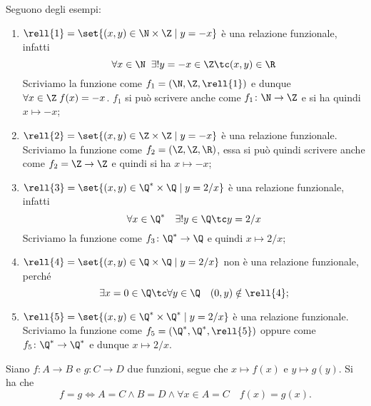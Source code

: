 \begin{examples}
    Seguono degli esempi:
    \begin{enumerate}
        \item \(\rell{1} = \set{(x, y) \in \N \times \Z \mid y = -x}\) è una relazione funzionale, infatti 
            \[
                \forall x \in \N \;\; \exists! y = -x \in \Z \tc (x, y) \in \R
            \]
            Scriviamo la funzione come \(f_1 = (\N, \Z, \rell{1})\) e dunque \(\forall x \in \Z \; f(x) = -x\).
            \(f_1\) si può scrivere anche come \(f_1 \colon \N \to \Z\) e si ha quindi \(x \mapsto -x\);
% 
        \item \(\rell{2} = \set{(x, y) \in \Z \times \Z \mid y = -x}\) è una relazione funzionale. \\
            Scriviamo la funzione come \(f_2 = (\Z, \Z, \R)\), essa si può quindi scrivere anche come \(f_2 = \Z \to \Z\) e quindi si ha \(x \mapsto -x\);
% 
        \item \(\rell{3} = \set{(x, y) \in \Q^* \times \Q \mid y = 2/x}\) è una relazione funzionale, infatti
            \[
                \forall x \in \Q^* \quad \exists! y \in \Q \tc y = 2/x
            \]
            Scriviamo la funzione come \(f_3 \colon \Q^* \to \Q\) e quindi \(x \mapsto 2/x\);
% 
        \item \(\rell{4} = \set{(x, y) \in \Q \times \Q \mid y = 2/x}\) non è una relazione funzionale, perché
            \[
                \exists x = 0 \in \Q \tc \forall y \in \Q \quad (0, y) \notin \rell{4};
            \]
% 
        \item \(\rell{5} = \set{(x, y) \in \Q^* \times \Q^* \mid y = 2/x}\) è una relazione funzionale. Scriviamo la funzione come \(f_5 = (\Q^*, \Q^*, \rell{5})\) oppure come \(f_5 \colon \Q^* \to \Q^*\) e dunque \(x \mapsto 2/x\).
    \end{enumerate}
\end{examples}


\begin{remark}
    Siano \(f \colon A \to B\) e \(g \colon C \to D\) due funzioni, segue che \(x \mapsto f(x)\) e \(y \mapsto g(y)\). Si ha che
    \[
        f = g \Longleftrightarrow A = C \land B = D \land \forall x \in A = C \quad f(x) = g(x).
    \]
\end{remark}
